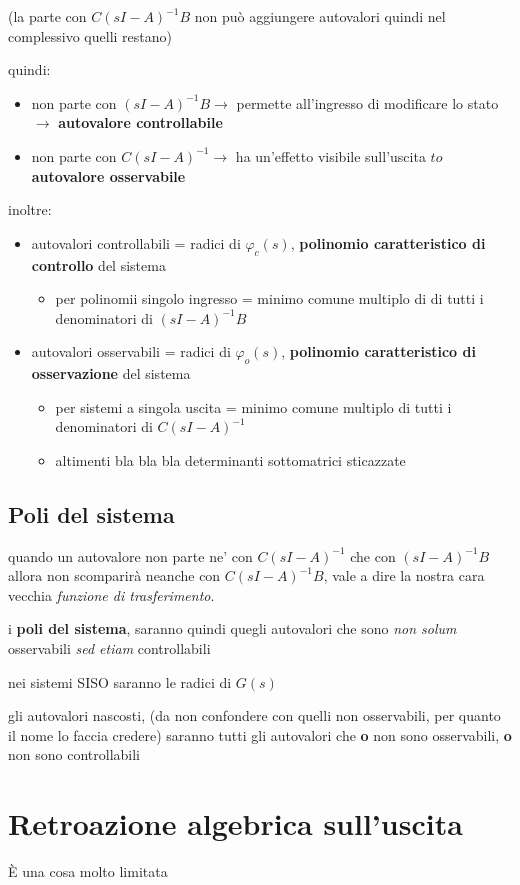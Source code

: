 \documentclass[11pt]{article}
\begin{document}
(la parte con \(C(sI-A)^{-1}B\) non può aggiungere autovalori quindi nel
complessivo quelli restano)

quindi:
\begin{itemize}
\item non parte con \((sI-A)^{-1}B \to\) permette all'ingresso di
modificare lo stato \(\to\) \textbf{autovalore controllabile}
\item non parte con \(C(sI-A)^{-1} \to\) ha un'effetto visibile
sull'uscita \(to\) \textbf{autovalore osservabile}
\end{itemize}

inoltre:
\begin{itemize}
\item autovalori controllabili = radici di \(\varphi _c(s)\),
\textbf{polinomio caratteristico di controllo} del sistema
\begin{itemize}
\item per polinomii singolo ingresso = minimo comune multiplo di
di tutti i denominatori di \((sI-A)^{-1}B\)
\end{itemize}
\item autovalori osservabili = radici di \(\varphi _o(s)\),
\textbf{polinomio caratteristico di osservazione} del sistema
\begin{itemize}
\item per sistemi a singola uscita = minimo comune multiplo di
tutti i denominatori di \(C(sI-A)^{-1}\)
\item altimenti bla bla bla determinanti sottomatrici sticazzate
\end{itemize}
\end{itemize}

\subsection{Poli del sistema}
\label{sec:org501d5ad}
quando un autovalore non parte ne' con \(C(sI-A)^{-1}\) che con
\((sI-A)^{-1}B\) allora non scomparirà neanche con \(C(sI-A)^{-1}B\), vale
a dire la nostra cara vecchia \emph{funzione di trasferimento}.

i \textbf{poli del sistema}, saranno quindi quegli autovalori che sono \emph{non
solum} osservabili \emph{sed etiam} controllabili

nei sistemi SISO saranno le radici di \(G(s)\)

gli autovalori nascosti, (da non confondere con quelli non
osservabili, per quanto il nome lo faccia credere) saranno tutti gli
autovalori che \textbf{o} non sono osservabili, \textbf{o} non sono controllabili

\section{Retroazione algebrica sull'uscita}
\label{sec:orge9a97d6}

È una cosa molto limitata
\end{document}
